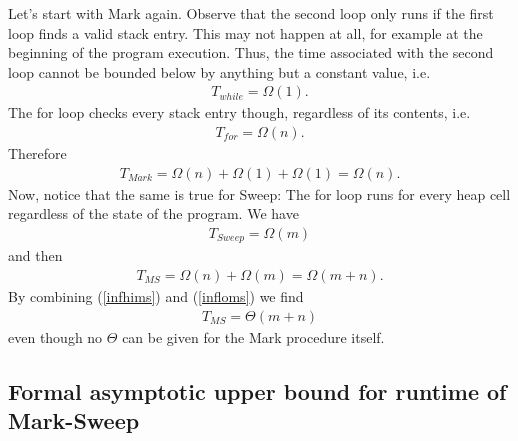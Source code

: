 \documentclass{article}
\begin{document}
Let's start with Mark again. Observe that the second loop only runs if
the first loop finds a valid stack entry. This may not happen at all, for
example at the beginning of the program execution. Thus, the time associated
with the second loop cannot be bounded below by anything but a constant value,
i.e.
\begin{align*}
	T_{while} = \Omega(1).
\end{align*}
The for loop checks every stack entry though, regardless of its contents, i.e.
\begin{align*}
	T_{for} = \Omega(n).
\end{align*}
Therefore
\begin{align*}
	T_{Mark} = \Omega(n) + \Omega(1) + \Omega(1) = \Omega(n).
\end{align*}
Now, notice that the same is true for Sweep: The for loop runs for every
heap cell regardless of the state of the program. We have
\begin{align*}
	T_{Sweep} = \Omega(m)
\end{align*}
and then
\begin{align}
	\label{infloms}
	T_{MS} = \Omega(n) + \Omega(m) = \Omega(m+n).
\end{align}
By combining (\ref{infhims}) and (\ref{infloms}) we find
\begin{align*}
	T_{MS} = \Theta(m+n)
\end{align*}
even though no $\Theta$ can be given for the Mark procedure itself.

\subsection{Formal asymptotic upper bound for runtime of Mark-Sweep}
\end{document}
